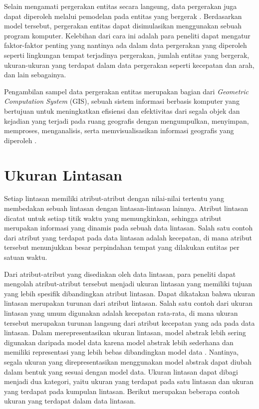 Selain mengamati pergerakan entitas secara langsung, data pergerakan juga dapat diperoleh melalui pemodelan pada entitas yang bergerak \cite{wiratma:trajectory}. Berdasarkan model tersebut, pergerakan entitas dapat disimulasikan menggunakan sebuah program komputer. Kelebihan dari cara ini adalah para peneliti dapat mengatur faktor-faktor penting yang nantinya ada dalam data pergerakan yang diperoleh seperti lingkungan tempat terjadinya pergerakan, jumlah entitas yang bergerak, ukuran-ukuran yang terdapat dalam data pergerakan seperti kecepatan dan arah, dan lain sebagainya. 

Pengambilan sampel data pergerakan entitas merupakan bagian dari \textit{Geometric Computation System} (GIS), sebuah sistem informasi berbasis komputer yang bertujuan untuk meningkatkan efisiensi dan efektivitas dari segala objek dan kejadian yang terjadi pada ruang geografis dengan mengumpulkan, menyimpan, memproses, menganalisis, serta memvisualisasikan informasi geografis yang diperoleh \cite{longley:02:gis}.

\section{Ukuran Lintasan}
\label{sec:ukuran}

Setiap lintasan memiliki atribut-atribut dengan nilai-nilai tertentu yang membedakan sebuah lintasan dengan lintasan-lintasan lainnya. Atribut lintasan dicatat untuk setiap titik waktu yang memungkinkan, sehingga atribut merupakan informasi yang dinamis pada sebuah data lintasan. Salah satu contoh dari atribut yang terdapat pada data lintasan adalah kecepatan, di mana atribut tersebut menunjukkan besar perpindahan tempat yang dilakukan entitas per satuan waktu.

Dari atribut-atribut yang disediakan oleh data lintasan, para peneliti dapat mengolah atribut-atribut tersebut menjadi ukuran lintasan yang memiliki tujuan yang lebih spesifik dibandingkan atribut lintasan. Dapat dikatakan bahwa ukuran lintasan merupakan turunan dari atribut lintasan. Salah satu contoh dari ukuran lintasan yang umum digunakan adalah kecepatan rata-rata, di mana ukuran tersebut merupakan turunan langsung dari atribut kecepatan yang ada pada data lintasan. Dalam merepresentasikan ukuran lintasan, model abstrak lebih sering digunakan daripada model data karena model abstrak lebih sederhana dan memiliki representasi yang lebih bebas dibandingkan model data \cite{wiratma:trajectory}. Nantinya, segala ukuran yang direpresentasikan menggunakan model abstrak dapat diubah dalam bentuk yang sesuai dengan model data. Ukuran lintasan dapat dibagi menjadi dua kategori, yaitu ukuran yang terdapat pada satu lintasan dan ukuran yang terdapat pada kumpulan lintasan. Berikut merupakan beberapa contoh ukuran yang terdapat dalam data lintasan.

